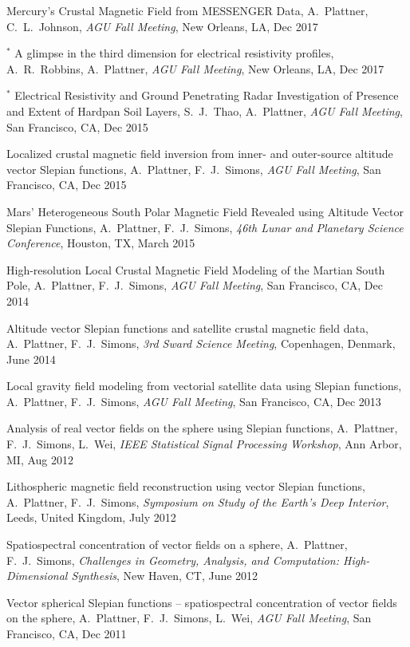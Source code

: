 \documentclass[10pt]{article}
\begin{document}
\spcp
Mercury's Crustal Magnetic Field from MESSENGER Data,
 A.~Plattner, C.~L.~Johnson, 
\emph{AGU Fall Meeting}, New Orleans, LA, Dec 2017 

\spcp
\hspace{-0.4cm} $^*$ A glimpse in the third dimension for electrical
resistivity profiles,
A.~R.~Robbins, A.~Plattner,
\emph{AGU Fall Meeting}, New Orleans, LA, Dec 2017 

\spcp
\hspace{-0.4cm} $^*$ Electrical Resistivity and Ground Penetrating Radar 
Investigation of Presence and Extent of Hardpan Soil Layers,
 S.~J.~Thao, A.~Plattner,
\emph{AGU Fall Meeting}, San Francisco, CA, Dec 2015

\spcp
Localized crustal magnetic field inversion from inner- and outer-source altitude vector Slepian functions,
A.~Plattner,  F.~J.~Simons,
\emph{AGU Fall Meeting}, San Francisco, CA, Dec 2015

\spcp
Mars' Heterogeneous South Polar Magnetic Field Revealed using Altitude Vector Slepian Functions,
A.~Plattner,  F.~J.~Simons,
\emph{46th Lunar and Planetary Science Conference}, Houston, TX, March 2015

\spcp
High-resolution Local Crustal Magnetic Field Modeling of the Martian South Pole,
A.~Plattner,  F.~J.~Simons,
\emph{AGU Fall Meeting}, San Francisco, CA, Dec 2014

\spcp
Altitude vector Slepian functions and satellite crustal magnetic field data,
A.~Plattner,  F.~J.~Simons,
\emph{3rd Sward Science Meeting}, Copenhagen, Denmark, June 2014

\spcp
Local gravity field modeling from vectorial satellite data using Slepian functions,
A.~Plattner,  F.~J.~Simons,
\emph{AGU Fall Meeting}, San Francisco, CA, Dec 2013

\spcp
Analysis of real vector fields on the sphere using Slepian functions,
A.~Plattner, F.~J.~Simons, L.~Wei,
\emph{IEEE Statistical Signal Processing Workshop}, Ann Arbor, MI, Aug 2012

\spcp
Lithospheric magnetic field reconstruction using vector Slepian functions,
A.~Plattner, F.~J.~Simons,
\emph{Symposium on Study of the Earth's Deep Interior}, Leeds, United Kingdom, July 2012

\spcp
Spatiospectral concentration of vector fields on a sphere,
A.~Plattner, F.~J.~Simons,
\emph{Challenges in Geometry, Analysis, and Computation: High-Dimensional Synthesis}, 
New Haven, CT, June 2012

\spcp
Vector spherical Slepian functions -- spatiospectral concentration of vector fields on the sphere,
A.~Plattner, F.~J.~Simons, L.~Wei,
\emph{AGU Fall Meeting}, San Francisco, CA, Dec 2011
\end{document}
